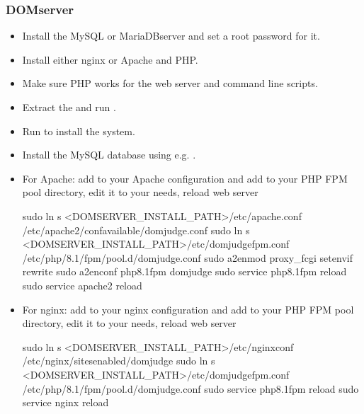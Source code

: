 \documentclass[a4paper,10pt,english,openany]{sphinxmanual}
\begin{document}
\subsubsection{DOMserver}
\label{\detokenize{quick-install:domserver}}\begin{itemize}
\item {} 
\sphinxAtStartPar
Install the MySQL\sphinxhyphen{} or MariaDB\sphinxhyphen{}server and set a root password for it.

\item {} 
\sphinxAtStartPar
Install either nginx or Apache and PHP.

\item {} 
\sphinxAtStartPar
Make sure PHP works for the web server and command line scripts.

\item {} 
\sphinxAtStartPar
Extract the  and run
.

\item {} 
\sphinxAtStartPar
Run  to install the system.

\item {} 
\sphinxAtStartPar
Install the MySQL database using e.g.
.

\item {} 
\sphinxAtStartPar
For Apache: add  to your Apache configuration and
add  to your PHP FPM pool directory, edit
it to your needs, reload web server
\begin{sphinxalltt}
sudo ln \sphinxhyphen{}s \textless{}DOMSERVER\_INSTALL\_PATH\textgreater{}/etc/apache.conf /etc/apache2/conf\sphinxhyphen{}available/domjudge.conf
sudo ln \sphinxhyphen{}s \textless{}DOMSERVER\_INSTALL\_PATH\textgreater{}/etc/domjudge\sphinxhyphen{}fpm.conf /etc/php/8.1/fpm/pool.d/domjudge.conf
sudo a2enmod proxy\_fcgi setenvif rewrite
sudo a2enconf php8.1\sphinxhyphen{}fpm domjudge
sudo service php8.1\sphinxhyphen{}fpm reload
sudo service apache2 reload
\end{sphinxalltt}

\item {} 
\sphinxAtStartPar
For nginx: add  to your nginx configuration and
add  to your PHP FPM pool directory, edit
it to your needs, reload web server
\begin{sphinxalltt}
sudo ln \sphinxhyphen{}s \textless{}DOMSERVER\_INSTALL\_PATH\textgreater{}/etc/nginx\sphinxhyphen{}conf /etc/nginx/sites\sphinxhyphen{}enabled/domjudge
sudo ln \sphinxhyphen{}s \textless{}DOMSERVER\_INSTALL\_PATH\textgreater{}/etc/domjudge\sphinxhyphen{}fpm.conf /etc/php/8.1/fpm/pool.d/domjudge.conf
sudo service php8.1\sphinxhyphen{}fpm reload
sudo service nginx reload
\end{sphinxalltt}


\end{itemize}
\end{document}
